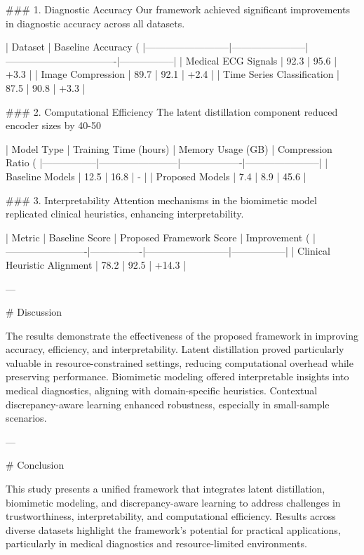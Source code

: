 ### 1. Diagnostic Accuracy
Our framework achieved significant improvements in diagnostic accuracy across all datasets.

| Dataset                  | Baseline Accuracy (%
|--------------------------|-----------------------|----------------------------------|-----------------|
| Medical ECG Signals      | 92.3                 | 95.6                             | +3.3            |
| Image Compression        | 89.7                 | 92.1                             | +2.4            |
| Time Series Classification | 87.5                | 90.8                             | +3.3            |

### 2. Computational Efficiency
The latent distillation component reduced encoder sizes by 40-50%

| Model Type      | Training Time (hours) | Memory Usage (GB) | Compression Ratio (%
|-----------------|------------------------|-------------------|-----------------------|
| Baseline Models | 12.5                  | 16.8              | -                     |
| Proposed Models | 7.4                   | 8.9               | 45.6                  |

### 3. Interpretability
Attention mechanisms in the biomimetic model replicated clinical heuristics, enhancing interpretability.

| Metric                  | Baseline Score | Proposed Framework Score | Improvement (%
|-------------------------|----------------|--------------------------|-----------------|
| Clinical Heuristic Alignment | 78.2           | 92.5                     | +14.3           |

---

# Discussion

The results demonstrate the effectiveness of the proposed framework in improving accuracy, efficiency, and interpretability. Latent distillation proved particularly valuable in resource-constrained settings, reducing computational overhead while preserving performance. Biomimetic modeling offered interpretable insights into medical diagnostics, aligning with domain-specific heuristics. Contextual discrepancy-aware learning enhanced robustness, especially in small-sample scenarios.

---

# Conclusion

This study presents a unified framework that integrates latent distillation, biomimetic modeling, and discrepancy-aware learning to address challenges in trustworthiness, interpretability, and computational efficiency. Results across diverse datasets highlight the framework's potential for practical applications, particularly in medical diagnostics and resource-limited environments.

